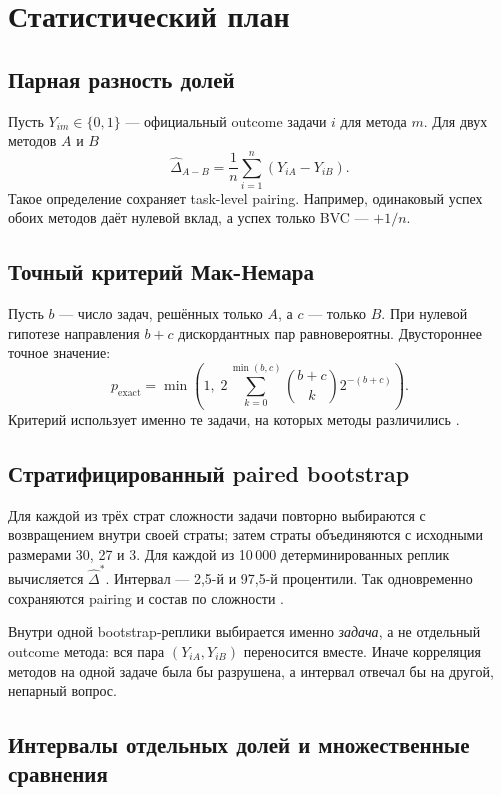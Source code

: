 \documentclass[11pt]{article}
\begin{document}
\section{Статистический план}

\subsection{Парная разность долей}

Пусть \(Y_{im}\in\{0,1\}\) --- официальный outcome задачи \(i\) для метода
\(m\). Для двух методов \(A\) и \(B\)
\[
\widehat{\Delta}_{A-B}
=\frac{1}{n}\sum_{i=1}^{n}(Y_{iA}-Y_{iB}).
\]
Такое определение сохраняет task-level pairing. Например, одинаковый успех
обоих методов даёт нулевой вклад, а успех только BVC --- \(+1/n\).

\subsection{Точный критерий Мак-Немара}

Пусть \(b\) --- число задач, решённых только \(A\), а \(c\) --- только \(B\).
При нулевой гипотезе направления \(b+c\) дискордантных пар равновероятны.
Двустороннее точное значение:
\[
p_{\mathrm{exact}}
=\min\!\left(
1,\;
2\sum_{k=0}^{\min(b,c)}
\binom{b+c}{k}2^{-(b+c)}
\right).
\]
Критерий использует именно те задачи, на которых методы различились
\cite{mcnemar1947}.

\subsection{Стратифицированный paired bootstrap}

Для каждой из трёх страт сложности задачи повторно выбираются с возвращением
внутри своей страты; затем страты объединяются с исходными размерами
30, 27 и 3. Для каждой из 10\,000 детерминированных реплик вычисляется
\(\widehat{\Delta}^{\ast}\). Интервал --- 2,5-й и 97,5-й процентили.
Так одновременно сохраняются pairing и состав по сложности
\cite{efron1993bootstrap}.

Внутри одной bootstrap-реплики выбирается именно \emph{задача}, а не
отдельный outcome метода: вся пара \((Y_{iA},Y_{iB})\) переносится вместе.
Иначе корреляция методов на одной задаче была бы разрушена, а интервал отвечал
бы на другой, непарный вопрос.

\subsection{Интервалы отдельных долей и множественные сравнения}
\end{document}
